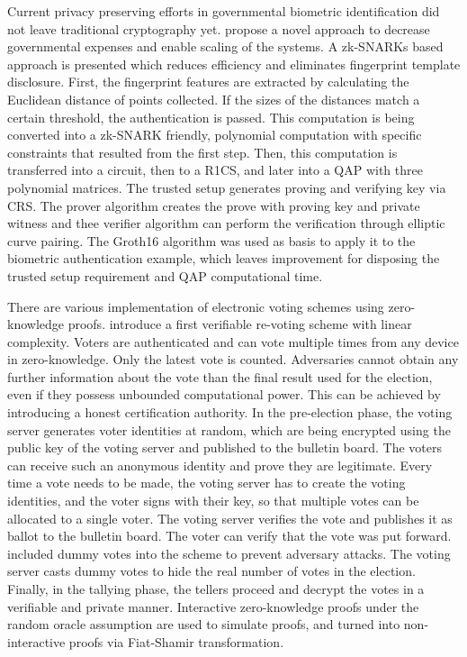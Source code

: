 Current privacy preserving efforts in governmental biometric identification did not leave traditional cryptography yet. \citet{Guo} propose a novel approach to decrease governmental expenses and enable scaling of the systems. A zk-SNARKs based approach is presented which reduces efficiency and eliminates fingerprint template disclosure. First, the fingerprint features are extracted by calculating the Euclidean distance of points collected. If the sizes of the distances match a certain threshold, the authentication is passed. This computation is being converted into a zk-SNARK friendly, polynomial computation with specific constraints that resulted from the first step. Then, this computation is transferred into a circuit, then to a R1CS, and later into a QAP with three polynomial matrices. The trusted setup generates proving and verifying key via CRS. The prover algorithm creates the prove with proving key and private witness and thee verifier algorithm can perform the verification through elliptic curve pairing. The Groth16 algorithm was used as basis to apply it to the biometric authentication example, which leaves improvement for disposing the trusted setup requirement and QAP computational time.

There are various implementation of electronic voting schemes using zero-knowledge proofs. \citet{Querejeta} introduce a first verifiable re-voting scheme with linear complexity. Voters are authenticated and can vote multiple times from any device in zero-knowledge. Only the latest vote is counted. Adversaries cannot obtain any further information about the vote than the final result used for the election, even if they possess unbounded computational power. This can be achieved by introducing a honest certification authority. In the pre-election phase, the voting server generates voter identities at random, which are being encrypted using the public key of the voting server and published to the bulletin board. The voters can receive such an anonymous identity and prove they are legitimate. Every time a vote needs to be made, the voting server has to create the voting identities, and the voter signs with their key, so that multiple votes can be allocated to a single voter. The voting server verifies the vote and publishes it as ballot to the bulletin board. The voter can verify that the vote was put forward. \citet{Querejeta} included dummy votes into the scheme to prevent adversary attacks. The voting server casts dummy votes to hide the real number of votes in the election. Finally, in the tallying phase, the tellers proceed and decrypt the votes in a verifiable and private manner. Interactive zero-knowledge proofs under the random oracle assumption are used to simulate proofs, and turned into non-interactive proofs via Fiat-Shamir transformation.


